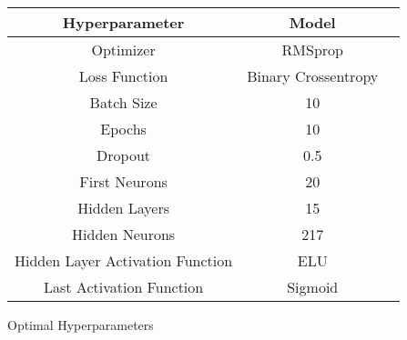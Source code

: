 \begin{tabular}{|c|c|c|}
    \hline
    Hyperparameter & Model\\
    \hline
    \hline
    Optimizer &  RMSprop \\
    \hline
    Loss Function &  Binary Crossentropy \\
    \hline
    Batch Size & 10\\
    \hline
    Epochs & 10\\
    \hline
    Dropout & 0.5 \\
    \hline
    First Neurons & 20\\
    \hline
    Hidden Layers & 15\\
    \hline
    Hidden Neurons & 217\\
    \hline
    Hidden Layer Activation Function & ELU\\
    \hline
    Last Activation Function & Sigmoid\\
    \hline
\end{tabular}
\caption{Optimal Hyperparameters}
\label{tab:Optimal Hyperparameters uart}